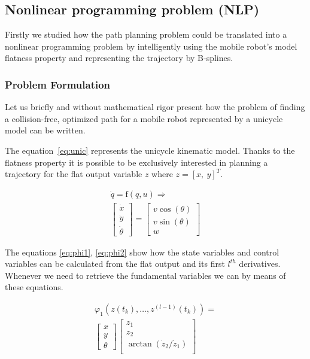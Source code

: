 \subsection{Nonlinear programming problem (NLP)}

Firstly we studied how the path planning problem could be translated into a nonlinear programming problem by intelligently using the mobile robot's model flatness property and representing the trajectory by B-splines.

\subsubsection{Problem Formulation}

Let us briefly and without mathematical rigor present how the problem of finding a collision-free, optimized path for a mobile robot represented by a unicycle model can be written.

The equation~\ref{eq:unic} represents the unicycle kinematic model. Thanks to the flatness property it is possible to be exclusively interested in planning a trajectory for the flat output variable $z$ where $z = [x,\ y]^T$.

\begin{equation}\label{eq:unic}
\begin{array}{c}
\dot{q} = \mathrm{f}(q, u) \Rightarrow\\
\left[\begin{array}{c}
\dot{x}\\
\dot{y}\\
\dot{\theta}
\end{array}\right]=
\left[\begin{array}{c}
v\cos(\theta)\\
v\sin(\theta)\\
w
\end{array}\right]
\end{array}    
\end{equation}

The equations \ref{eq:phi1}, \ref{eq:phi2} show how the state variables and control variables can be calculated from the flat output and its first $l^{th}$ derivatives. Whenever we need to retrieve the fundamental variables we can by means of these equations.

\begin{equation}\label{eq:phi1}
            \begin{array}{l}
            \varphi_1(z(t_k),\dotsc,z^{(l-1)}(t_k))=\\
            \left[\begin{array}{c}
            x\\
            y\\
            \theta
            \end{array}\right]
            \left[\begin{array}{c}
            z_1\\
            z_2\\
            \arctan(\dot{z}_2/\dot{z}_1)\\
            \end{array}\right]
            \end{array}
\end{equation}

